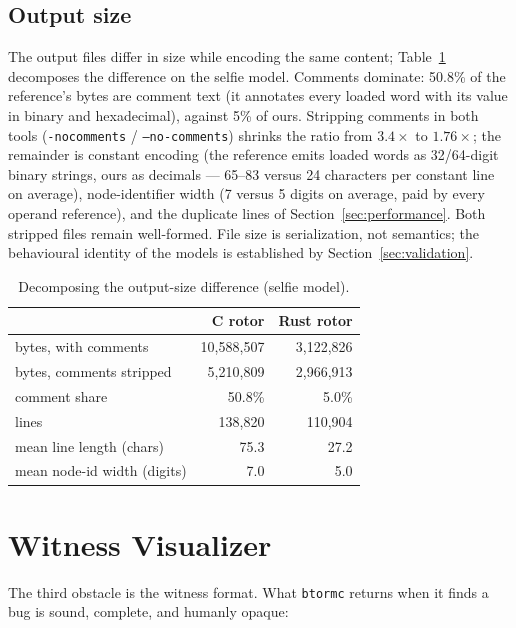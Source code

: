 \documentclass[sigplan,screen,nonacm]{acmart}
\begin{document}
\subsection{Output size}
\label{sec:size}

The output files differ in size while encoding the same content;
Table~\ref{tab:size} decomposes the difference on the selfie model.
Comments dominate: 50.8\% of the reference's bytes are comment text
(it annotates every loaded word with its value in binary and
hexadecimal), against 5\% of ours. Stripping comments in both tools
(\texttt{-nocomments} / \texttt{--no-comments}) shrinks the ratio from
$3.4\times$ to $1.76\times$; the remainder is constant encoding (the
reference emits loaded words as 32/64-digit binary strings, ours as
decimals --- 65--83 versus 24 characters per constant line on average),
node-identifier width (7 versus 5 digits on average, paid by every
operand reference), and the duplicate lines of
Section~\ref{sec:performance}. Both stripped files remain well-formed.
File size is serialization, not semantics; the behavioural identity of
the models is established by Section~\ref{sec:validation}.

\begin{table}[t]
\caption{Decomposing the output-size difference (selfie model).}
\label{tab:size}
\centering
\footnotesize
\begin{tabular}{lrr}
\toprule
 & C rotor & Rust rotor \\
\midrule
bytes, with comments & 10{,}588{,}507 & 3{,}122{,}826 \\
bytes, comments stripped & 5{,}210{,}809 & 2{,}966{,}913 \\
comment share & 50.8\% & 5.0\% \\
lines & 138{,}820 & 110{,}904 \\
mean line length (chars) & 75.3 & 27.2 \\
mean node-id width (digits) & 7.0 & 5.0 \\
\bottomrule
\end{tabular}
\end{table}

\section{Witness Visualizer}
\label{sec:visualizer}

The third obstacle is the witness format. What \texttt{btormc} returns
when it finds a bug is sound, complete, and humanly opaque:
\end{document}
